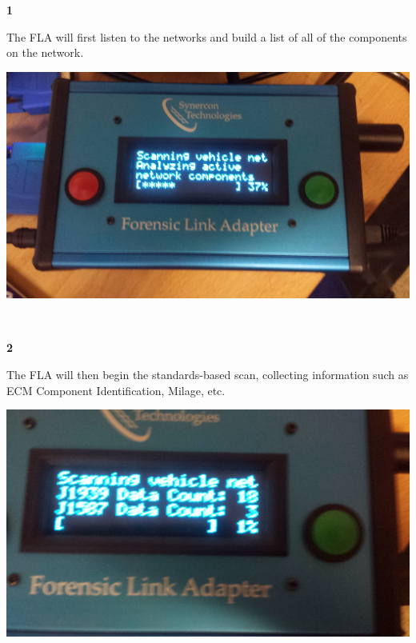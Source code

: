\documentclass[11pt]{article}
\begin{document}
\noindent\begin{minipage}{0.3\textwidth}%
\begin{center}
\textbf{1}\\[\baselineskip]
\end{center}
The FLA will first listen to the
networks and build a list of all
of the components on the network.
\end{minipage}%
\hfill%
\begin{minipage}{0.6\textwidth}
\includegraphics[width=\linewidth]{./fla_screens/scan_1}
\end{minipage}
\\[\baselineskip]
\noindent\begin{minipage}{0.3\textwidth}%
\begin{center}
\textbf{2}\\[\baselineskip]
\end{center}
The FLA will then begin the standards-based scan, collecting information such as ECM Component Identification, Milage, etc.
\end{minipage}%
\hfill%
\begin{minipage}{0.6\textwidth}
\includegraphics[width=\linewidth]{./fla_screens/scan_2}
\end{minipage}
\end{document}
